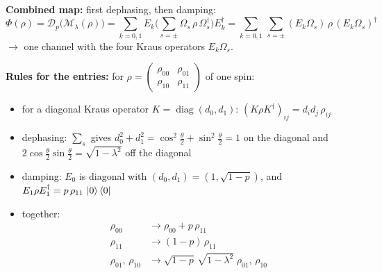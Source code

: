 \textbf{Combined map:} first dephasing, then damping:
\begin{equation*}
    \Phi(\rho) = \mathcal{D}_p\big(\mathcal{M}_\lambda(\rho)\big)
    = \sum_{k=0,1} E_k \Big( \sum_{s=\pm} \Omega_s\, \rho\, \Omega_s^\dagger \Big) E_k^\dagger
    = \sum_{k=0,1}\, \sum_{s=\pm} (E_k \Omega_s)\, \rho\, (E_k \Omega_s)^\dagger
\end{equation*}
$\to$ one channel with the four Kraus operators $E_k\Omega_s$.

\textbf{Rules for the entries:} for $\rho = \begin{pmatrix} \rho_{00} & \rho_{01} \\ \rho_{10} & \rho_{11} \end{pmatrix}$
of one spin:
\begin{itemize}
    \item for a diagonal Kraus operator $K = \operatorname{diag}(d_0, d_1)$:
    $(K\rho K^\dagger)_{ij} = d_i d_j\, \rho_{ij}$
    \item dephasing: $\sum_s$ gives $d_0^2 + d_1^2 = \cos^2\frac{\theta}{2} + \sin^2\frac{\theta}{2} = 1$ on the
    diagonal and $2\cos\frac{\theta}{2}\sin\frac{\theta}{2} = \sqrt{1-\lambda^2}$ off the diagonal
    \item damping: $E_0$ is diagonal with $(d_0, d_1) = (1, \sqrt{1-p})$, and
    $E_1 \rho E_1^\dagger = p\, \rho_{11}\, \ket{0}\bra{0}$
    \item together:
    \begin{align*}
        \rho_{00} &\to \rho_{00} + p\, \rho_{11} \\
        \rho_{11} &\to (1-p)\, \rho_{11} \\
        \rho_{01},\, \rho_{10} &\to \sqrt{1-p}\,\sqrt{1-\lambda^2}\;\rho_{01},\, \rho_{10}
    \end{align*}
\end{itemize}

